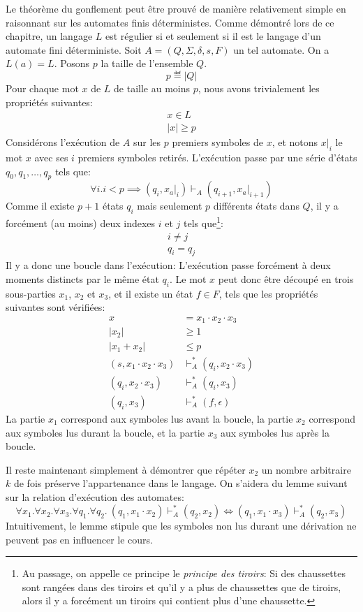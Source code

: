 Le théorème du gonflement peut être prouvé de manière relativement simple en raisonnant sur les automates finis déterministes.
Comme démontré lors de ce chapitre, un langage $L$ est régulier si et seulement si il est le langage d'un automate fini déterministe. Soit $A = (Q, \Sigma, \delta, s, F)$ un tel automate. On a $L(a) = L$.
Posons $p$ la taille de l'ensemble $Q$.
\[
p \eqdef |Q|
\]
Pour chaque mot $x$ de $L$ de taille au moins $p$, nous avons trivialement les propriétés suivantes:
\begin{gather*}
x \in L\\
|x| \geq p
\end{gather*}
Considérons l'exécution de $A$ sur les $p$ premiers symboles de $x$, et notons $x\rvert_{i}$ le mot $x$ avec ses $i$ premiers symboles retirés. L'exécution passe par une série d'états $q_0, q_1, \dots, q_p$ tels que:
\[
\forall i. i < p \implies (q_i, x_a\rvert_i) \vdash_A (q_{i+1}, x_a\rvert_{i+1})
\]
Comme il existe $p + 1$ états $q_i$ mais seulement $p$ différents états dans $Q$, il y a forcément (au moins) deux indexes $i$ et $j$ tels que\footnote{%
Au passage, on appelle ce principe le \textit{principe des tiroirs}: Si des chaussettes sont rangées dans des tiroirs et qu'il y a plus de chaussettes que de tiroirs, alors il y a forcément un tiroirs qui contient plus d'une chaussette.%
}:
\begin{gather*}
i \neq j\\
q_i = q_j
\end{gather*}
Il y a donc une boucle dans l'exécution: L'exécution passe forcément à deux moments distincts par le même état $q_i$.
Le mot $x$ peut donc être découpé en trois sous-parties $x_1$, $x_2$ et $x_3$, et il existe un état $f \in F$, tels que les propriétés suivantes sont vérifiées:
\begin{align*}
x &= x_1 \cdot x_2 \cdot x_3\\
|x_2| &\geq 1\\
|x_1 + x_2| &\leq p\\
(s, x_1 \cdot x_2 \cdot x_3) &\vdash_A^* (q_i, x_2 \cdot x_3)\\
(q_i, x_2 \cdot x_3) &\vdash_A^* (q_i, x_3)\\
(q_i, x_3) &\vdash_A^* (f, \epsilon)
\end{align*}
La partie $x_1$ correspond aux symboles lus avant la boucle, la partie $x_2$ correspond aux symboles lus durant la boucle, et la partie $x_3$ aux symboles lus après la boucle.

Il reste maintenant simplement à démontrer que répéter $x_2$ un nombre arbitraire $k$ de fois préserve l'appartenance dans le langage.
On s'aidera du lemme suivant sur la relation d'exécution des automates:
\[
\forall x_1. \forall x_2. \forall x_3. \forall q_1. \forall q_2.\ (q_1, x_1 \cdot x_2) \vdash_A^* (q_2, x_2) \iff (q_1, x_1 \cdot x_3) \vdash_A^* (q_2, x_3)
\]
Intuitivement, le lemme stipule que les symboles non lus durant une dérivation ne peuvent pas en influencer le cours.

